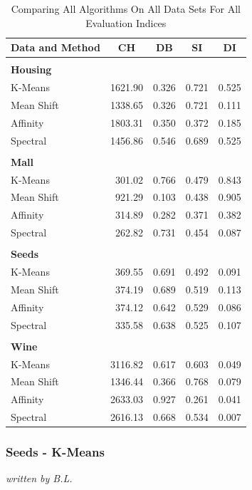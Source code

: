 \begin{table}[H]
\begin{center}
\begin{tabular}{lrrrr}
Data and Method & \multicolumn{1}{c}{\gls{CH}} & \multicolumn{1}{c}{\gls{DB}} & \multicolumn{1}{c}{\gls{SI}} & \multicolumn{1}{c}{\gls{DI}} \\ \hline
 &  &  &  &  \\
\textbf{Housing} &  &  &  & \\
K-Means & 1621.90 & 0.326 & 0.721 & 0.525 \\
Mean Shift & 1338.65 & 0.326 & 0.721 & 0.111 \\
Affinity & 1803.31 & 0.350 & 0.372 & 0.185 \\
Spectral & 1456.86 & 0.546 & 0.689 & 0.525 \\
 &  &  &  &  \\
\textbf{Mall} &  &  &  &  \\
K-Means & 301.02 & 0.766 & 0.479 & 0.843 \\
Mean Shift & 921.29 & 0.103 & 0.438 & 0.905 \\
Affinity & 314.89 & 0.282 & 0.371 & 0.382 \\
Spectral & 262.82 & 0.731 & 0.454 & 0.087 \\
 &  &  &  &  \\
\textbf{Seeds} &  &  &  &  \\
K-Means & 369.55 & 0.691 & 0.492 & 0.091 \\
Mean Shift & 374.19 & 0.689 & 0.519 & 0.113 \\
Affinity & 374.12 & 0.642 & 0.529 & 0.086 \\
Spectral & 335.58 & 0.638 & 0.525 & 0.107 \\
 &  &  &  &  \\
\textbf{Wine} &  &  &  &  \\
K-Means & 3116.82 & 0.617 & 0.603 & 0.049 \\
Mean Shift & 1346.44 & 0.366 & 0.768 & 0.079 \\
Affinity & 2633.03 & 0.927 & 0.261 & 0.041 \\
Spectral & 2616.13 & 0.668 & 0.534 & 0.007
\end{tabular}%
\end{center}
\caption{Comparing All Algorithms On All Data Sets For All Evaluation Indices}
\label{tab:evalutaion_table}
\end{table}


\subsubsection{Seeds - K-Means}
\textit{written by B.L.}\\

